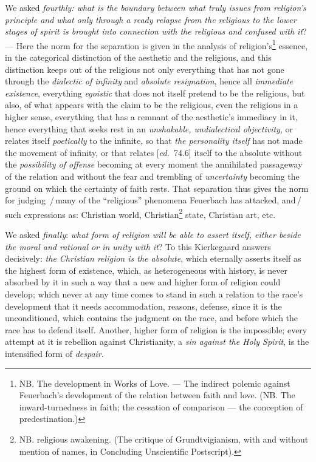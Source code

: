 \documentclass[12pt,a4paper,openany]{book}
\newcommand{\kpage}[1]{\marginnote{\footnotesize\textit{[#1]}}}
\newcommand{\ed}[1]{{\small[\textit{ed.}\ #1]}}
\newcommand{\ins}[1]{\,/\,#1\,/\,}
\begin{document}
We asked \emph{fourthly: what is the boundary between what truly issues
from religion's principle and what only through a ready relapse from the
religious to the lower stages of spirit is brought into connection with the religious and confused
with it}? --- Here the norm for the separation is given in the analysis of
religion's\footnote[114]{NB. The development in Works of Love. --- The indirect polemic against
Feuerbach's development of the relation between faith and love. (NB. The inward-turnedness
in faith; the cessation of comparison --- the conception of predestination.)}
essence, in the categorical distinction of the aesthetic
and the religious, and this distinction keeps out of
the religious not only everything that has not gone through the \emph{dialectic of infinity} and
\emph{absolute resignation}, hence all \emph{immediate existence}, everything \emph{egoistic}
\kpage{165}that does not itself pretend to be the religious, but also, of what
appears with the claim to be the religious, even the religious in a
higher sense, everything that has a remnant of the aesthetic's
immediacy in it, hence everything that seeks rest in an \emph{unshakable,
undialectical objectivity}, or relates itself \emph{poetically} to the infinite, so
that \emph{the personality itself} has not made the movement of infinity, or
that relates \ed{74.6} itself to the absolute without the \emph{possibility of offense}
becoming at every moment the annihilated passageway of the relation and
without the fear and trembling of \emph{uncertainty} becoming the ground on which the certainty
of faith rests. That separation thus gives the norm for judging
\ins{many of the ``religious'' phenomena Feuerbach has
attacked, and} such expressions as: Christian world, Christian\footnote[115]{NB. religious awakening. (The critique of Grundtvigianism, with and without
mention of names, in Concluding Unscientific Postscript).}
state, Christian art, etc.

We asked \emph{finally}: \emph{what form of religion will be able to assert itself, either beside
the moral and rational or in unity with it}? To this
Kierkegaard answers decisively: \emph{the Christian religion is the absolute}, which eternally
asserts itself as the highest form of existence, which, as heterogeneous with
history, is never absorbed by it in such a way that a new and higher form of religion
could develop; which never at any time comes
to stand in such a relation to the race's development that it needs
accommodation, reasons, defense, since it is the unconditioned,
which contains the judgment on the race, and before which
the race has to defend itself. Another, higher form of religion
is the impossible; every attempt at it is rebellion against Christianity,
a \emph{sin against the Holy Spirit}, is the intensified form of \emph{despair}.
\end{document}

